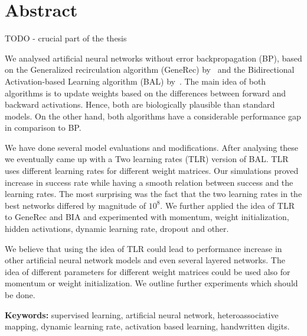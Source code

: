 
\section*{Abstract}
TODO - crucial part of the thesis 

We analysed artificial neural networks without error backpropagation (BP), based on the Generalized recirculation algorithm (GeneRec) by~\citet{o1996bio} and the Bidirectional Activation-based Learning algorithm (BAL) by~\citet{farkas2013bal}. The main idea of both algorithms is to update weights based on the differences between forward and backward activations. Hence, both are biologically plausible than standard models. On the other hand, both algorithms have a considerable performance gap in comparison to BP.

We have done several model evaluations and modifications. After analysing these we eventually came up with a Two learning rates (TLR) version of BAL. TLR uses different learning rates for different weight matrices. Our simulations proved increase in success rate while having a smooth relation between success and the learning rates. The most surprising was the fact that the two learning rates in the best networks differed by magnitude of $10^8$. We further applied the idea of TLR to GeneRec and BIA and experimented with momentum, weight initialization, hidden activations, dynamic learning rate, dropout and other. 

We believe that using the idea of TLR could lead to performance increase in other artificial neural network models and even several layered networks. The idea of different parameters for different weight matrices could be used also for momentum or weight initialization. We outline further experiments which should be done. 

\begin{flushleft}
  \textbf{Keywords:} supervised learning, artificial neural network, heteroassociative mapping, dynamic learning rate, activation based learning, handwritten digits. 
\end{flushleft}


